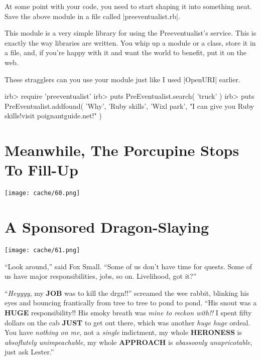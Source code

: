 \documentclass[12pt,twoside]{report}
\begin{document}
At some point with your code, you need to start shaping it into
something neat.  Save the above module in a file called
\rubyinline|preeventualist.rb|.

This module is a very simple library for using the Preeventualist's
service.  This is exactly the way libraries are written.  You whip up
a module or a class, store it in a file, and, if you're happy with it
and want the world to benefit, put it on the web.

These stragglers can you use your module just like I used
\rubyinline|OpenURI| earlier.


\begin{consolecode}

 irb> require 'preeventualist'
 irb> puts PreEventualist.search( 'truck' )
 irb> puts PreEventualist.addfound( 'Why', 'Ruby skills', 'Wixl park',
        "I can give you Ruby skills!\nCome visit poignantguide.net!" )

\end{consolecode}



\section{Meanwhile, The Porcupine Stops To Fill-Up}


	\texttt{[image: cache/60.png]}

\newpage


\section{A Sponsored Dragon-Slaying}


	\texttt{[image: cache/61.png]}

``Look around,'' said Fox Small.  ``Some of us don't have time for
        quests.  Some of us have major responsibilities, jobs, so on.
        Livelihood, got it?''

``{\em Heyyyy}, my {\bf JOB} was to kill the drgn!!'' screamed the wee
        rabbit, blinking his eyes and bouncing frantically from tree
        to tree to pond to pond.  ``His snout was a {\bf HUGE}
        responsibility!!  His smoky breath was {\em mine to reckon
          with!!} I spent fifty dollars on the cab {\bf JUST} to get
        out there, which was another {\em huge huge} ordeal.  You have
        {\em nothing on me}, not a {\em single} indictment, my whole
        {\bf HERONESS} is {\em absoflutely unimpeachable}, my whole
        {\bf APPROACH} is {\em abassoonly unapricotable}, just ask
        Lester.''
\end{document}
